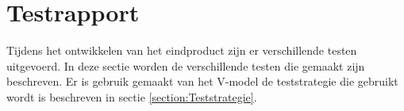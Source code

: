 \section{Testrapport}
Tijdens het ontwikkelen van het eindproduct zijn er verschillende testen uitgevoerd.
In deze sectie worden de verschillende testen die gemaakt zijn beschreven.
Er is gebruik gemaakt van het V-model de teststrategie die gebruikt wordt is beschreven in sectie \ref{section:Teststrategie}.



\newpage


\newpage


